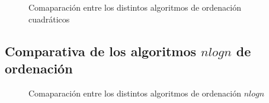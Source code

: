 \documentclass{article}
\begin{document}
\begin{figure}[H]
  \centering   
      \subfloat {%

        
        
      }
      



\caption{Comaparación entre los distintos algoritmos de ordenación cuadráticos}
\end{figure}


\subsection{Comparativa de los algoritmos $nlogn$ de ordenación}

\begin{figure}[H]
  \centering   
      \subfloat {%

        
        
      }
      
\caption{Comaparación entre los distintos algoritmos de ordenación $nlogn$}
\end{figure}
\end{document}
